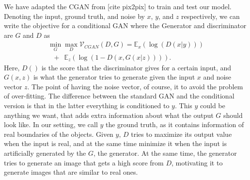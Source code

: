 We have adapted the CGAN from [cite pix2pix] to train and test our model. Denoting the input, ground truth, and noise by $x$, $y$, and $z$ respectively, we can write the objective for a conditional GAN where the Generator and discriminator are $G$ and $D$ as
\begin{equation}
\begin{array}{l}
\min_G \max_D \mathcal{V}_{CGAN}(D,G) = \mathbb{E}_{x}(\log(D(x|y)))\\
\, \, \, \,+ \, \, \, \mathbb{E}_{z}(\log(1-D(x,G(x|z)))).
\end{array}
\end{equation}
Here, $D()$ is the score that the discriminator gives for a certain input, and $G(x,z)$ is what the generator tries to generate given the input $x$ and noise vector $z$. The point of having the noise vector, of course, it to avoid the problem of over-fitting. The difference between the standard GAN and the conditional version is that in the latter everything is conditioned to $y$. This $y$ could be anything we want, that adds extra information about what the output $G$ should look like. In our setting, we call $y$ the ground truth, as it contains information of real boundaries of the objects. Given $y$, $D$ tries to maximize its output value when the input is real, and at the same time minimize it when the input is artificially generated by the $G$, the generator. At the same time, the generator tries to generate an image that gets a high score from $D$, motivating it to generate images that are similar to real ones.

